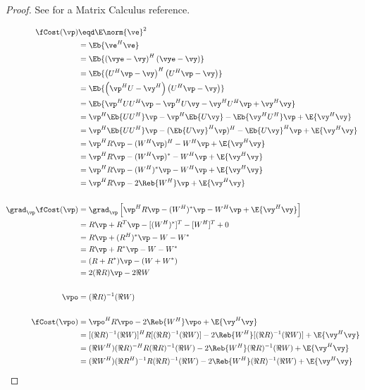 \begin{proof}
See  for a Matrix Calculus reference.

\begin{align*}
   \fCost(\vp)
     &\eqd \E \norm{\ve}^2
   \\&=    \Eb{\ve^H\ve}
   \\&=    \Eb{ \left(\vye-\vy\right)^H\left(\vye-\vy\right) }
   \\&=    \Eb{ \left(U^H\vp-\vy\right)^H\left(U^H\vp-\vy\right) }
   \\&=    \Eb{ \left(\vp^HU-\vy^H\right)\left(U^H\vp-\vy\right) }
   \\&=    \Eb{ \vp^HUU^H\vp - \vp^HU\vy -\vy^HU^H\vp + \vy^H\vy }
   \\&=    \vp^H\Eb{UU^H}\vp - \vp^H\Eb{U\vy} -\Eb{\vy^HU^H}\vp + \E{\vy^H\vy}
   \\&=    \vp^H\Eb{UU^H}\vp - (\Eb{U\vy}^H\vp)^H -\Eb{U\vy}^H\vp + \E{\vy^H\vy}
   \\&=    \vp^H R \vp - (W^H\vp)^H -W^H\vp + \E{\vy^H\vy}
   \\&=    \vp^H R \vp - (W^H\vp)^\ast -W^H\vp + \E{\vy^H\vy}
   \\&=    \vp^H R \vp - (W^H)^\ast\vp -W^H\vp + \E{\vy^H\vy}
   \\&=    \vp^H R \vp - 2\Reb{W^H}\vp + \E{\vy^H\vy}
\\
\\
   \grad_\vp \fCost(\vp)
     &= \grad_\vp \left[ \vp^H R \vp - (W^H)^\ast\vp -W^H\vp + \E{\vy^H\vy} \right]
   \\&= R\vp + R^T\vp - [(W^H)^\ast]^T - [W^H]^T + 0
   \\&= R\vp + (R^H)^\ast\vp - W - W^\ast
   \\&= R\vp + R^\ast\vp - W - W^\ast
   \\&= (R + R^\ast)\vp - (W + W^\ast)
   \\&= 2(\Re{R})\vp - 2\Re{W}
\\
\\
   \vpo
     &= (\Re{R})^{-1}(\Re{W})
\\
\\
   \fCost(\vpo)
     &=    \vpo^H R \vpo - 2\Reb{W^H}\vpo + \E{\vy^H\vy}
   \\&=    [(\Re{R})^{-1}(\Re{W})]^H R [(\Re{R})^{-1}(\Re{W})] - 2\Reb{W^H}[(\Re{R})^{-1}(\Re{W})] + \E{\vy^H\vy}
   \\&=    (\Re{W^H})(\Re{R})^{-H} R (\Re{R})^{-1}(\Re{W}) - 2\Reb{W^H}(\Re{R})^{-1}(\Re{W}) + \E{\vy^H\vy}
   \\&=    (\Re{W^H})(\Re{R^H})^{-1} R (\Re{R})^{-1}(\Re{W}) - 2\Reb{W^H}(\Re{R})^{-1}(\Re{W}) + \E{\vy^H\vy}

\end{align*}
\end{proof}
